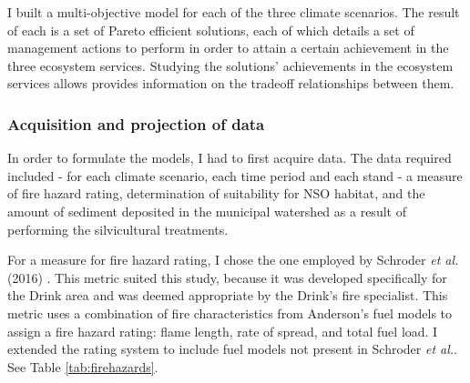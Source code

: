 I built a multi-objective model for each of the three climate scenarios. The result of each is a set of Pareto efficient solutions, each of which details a set of management actions to perform in order to attain a certain achievement in the three ecosystem services. Studying the solutions' achievements in the ecosystem services allows provides information on the tradeoff relationships between them.

\subsubsection{Acquisition and projection of data}
In order to formulate the models, I had to first acquire data. The data required included - for each climate scenario, each time period and each stand - a measure of fire hazard rating, determination of suitability for NSO habitat, and the amount of sediment deposited in the municipal watershed as a result of performing the silvicultural treatments.

For a measure for fire hazard rating, I chose the one employed by Schroder \textit{et al.} (2016) \cite{schroder2016multi}. This metric suited this study, because it was developed specifically for the Drink area and was deemed appropriate by the Drink's fire specialist. This metric uses a combination of fire characteristics from Anderson's fuel models \cite{anderson1982aids} to assign a fire hazard rating: flame length, rate of spread, and total fuel load. I extended the rating system to include fuel models not present in Schroder \textit{et al.}. See Table \ref{tab:firehazards}.

